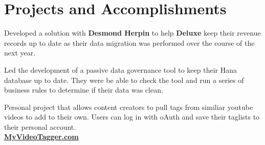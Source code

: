 \documentclass[]{deedy-resume-openfont}
\begin{document}
\begin{minipage}[t]{0.66\textwidth}

\section{Projects and Accomplishments}
Developed a solution with \textbf{Desmond Herpin} to help \textbf{Deluxe} keep their revenue records up to date as their data migration was performed over the course of the next year.
\sectionsep

Led the development of a passive data governance tool to keep their Hana database up to date.  They were be able to check the tool and run a series of business rules to determine if their data was clean.
\sectionsep

Personal project that allows content creators to pull tags from similiar youtube videos to add to their own.  Users can log in with  oAuth and save their taglists to their personal account. \\
\href{https://myvideotagger.com}{\bf MyVideoTagger.com}
\sectionsep


\end{minipage} 
\end{document}
